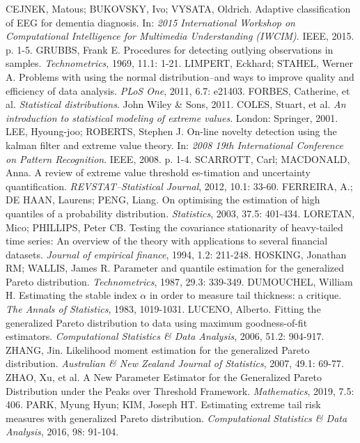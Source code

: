\documentclass[11pt,twoside,openright]{report}
\begin{document}
\begin{thebibliography}{L}
CEJNEK, Matous; BUKOVSKY, Ivo; VYSATA, Oldrich. Adaptive classification of EEG for dementia diagnosis. In: \textit{2015 International Workshop on Computational Intelligence for Multimedia Understanding (IWCIM)}. IEEE, 2015. p. 1-5.
GRUBBS, Frank E. Procedures for detecting outlying observations in samples. \textit{Technometrics}, 1969, 11.1: 1-21.
LIMPERT, Eckhard; STAHEL, Werner A. Problems with using the normal distribution–and ways to improve quality and efficiency of data analysis. \textit{PLoS One}, 2011, 6.7: e21403.
FORBES, Catherine, et al. \textit{Statistical distributions}. John Wiley \& Sons, 2011.
COLES, Stuart, et al. \textit{An introduction to statistical modeling of extreme values}. London: Springer, 2001.
LEE, Hyoung-joo; ROBERTS, Stephen J. On-line novelty detection using the kalman filter and extreme value theory. In: \textit{2008 19th International Conference on Pattern Recognition}. IEEE, 2008. p. 1-4.
SCARROTT, Carl; MACDONALD, Anna. A review of extreme value threshold es-timation and uncertainty quantification. \textit{REVSTAT–Statistical Journal}, 2012, 10.1: 33-60.
FERREIRA, A.; DE HAAN, Laurens; PENG, Liang. On optimising the estimation of high quantiles of a probability distribution. \textit{Statistics}, 2003, 37.5: 401-434.
LORETAN, Mico; PHILLIPS, Peter CB. Testing the covariance stationarity of heavy-tailed time series: An overview of the theory with applications to several financial datasets. \textit{Journal of empirical finance}, 1994, 1.2: 211-248.
HOSKING, Jonathan RM; WALLIS, James R. Parameter and quantile estimation for the generalized Pareto distribution. \textit{Technometrics}, 1987, 29.3: 339-349.
DUMOUCHEL, William H. Estimating the stable index $\alpha$ in order to measure tail thickness: a critique. \textit{The Annals of Statistics}, 1983, 1019-1031.
LUCENO, Alberto. Fitting the generalized Pareto distribution to data using maximum goodness-of-fit estimators. \textit{Computational Statistics \& Data Analysis}, 2006, 51.2: 904-917.
ZHANG, Jin. Likelihood moment estimation for the generalized Pareto distribution. \textit{Australian \& New Zealand Journal of Statistics}, 2007, 49.1: 69-77.
ZHAO, Xu, et al. A New Parameter Estimator for the Generalized Pareto Distribution under the Peaks over Threshold Framework. \textit{Mathematics}, 2019, 7.5: 406.
PARK, Myung Hyun; KIM, Joseph HT. Estimating extreme tail risk measures with generalized Pareto distribution. \textit{Computational Statistics \& Data Analysis}, 2016, 98: 91-104.

\end{thebibliography}
\end{document}
